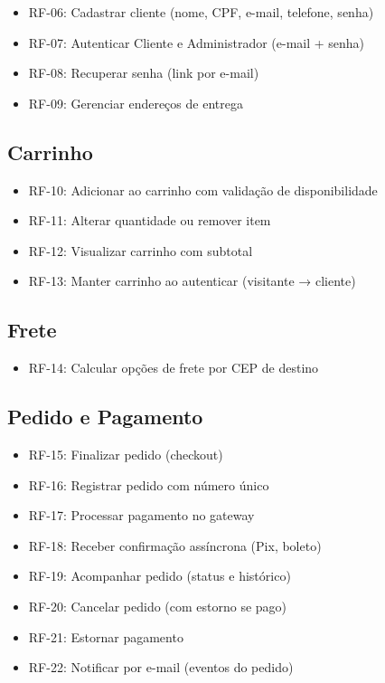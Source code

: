 \documentclass[12pt,a4paper]{article}
\providecommand{\tightlist}{%
  \setlength{\itemsep}{0pt}\setlength{\parskip}{0pt}}
\begin{document}
\begin{itemize}
\tightlist
\item RF-06: Cadastrar cliente (nome, CPF, e-mail, telefone, senha)
\item RF-07: Autenticar Cliente e Administrador (e-mail + senha)
\item RF-08: Recuperar senha (link por e-mail)
\item RF-09: Gerenciar endereços de entrega
\end{itemize}

\subsection{Carrinho}

\begin{itemize}
\tightlist
\item RF-10: Adicionar ao carrinho com validação de disponibilidade
\item RF-11: Alterar quantidade ou remover item
\item RF-12: Visualizar carrinho com subtotal
\item RF-13: Manter carrinho ao autenticar (visitante → cliente)
\end{itemize}

\subsection{Frete}

\begin{itemize}
\tightlist
\item RF-14: Calcular opções de frete por CEP de destino
\end{itemize}

\subsection{Pedido e Pagamento}

\begin{itemize}
\tightlist
\item RF-15: Finalizar pedido (checkout)
\item RF-16: Registrar pedido com número único
\item RF-17: Processar pagamento no gateway
\item RF-18: Receber confirmação assíncrona (Pix, boleto)
\item RF-19: Acompanhar pedido (status e histórico)
\item RF-20: Cancelar pedido (com estorno se pago)
\item RF-21: Estornar pagamento
\item RF-22: Notificar por e-mail (eventos do pedido)
\end{itemize}
\end{document}
